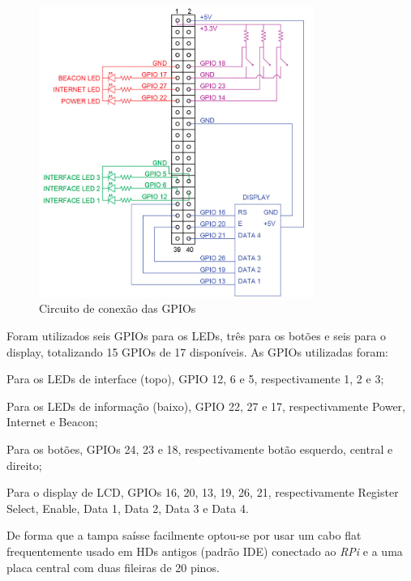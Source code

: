 \documentclass[
		12pt,				%
		openright,			%
		oneside,			%
		a4paper,			%
		chapter=TITLE,		%
		english,			%
		brazil				%
	]{abntex2}
\begin{document}
\begin{figure}[htb]
	\caption{\label{fig:pinout-gpio}Circuito de conexão das GPIOs}
	\begin{center}
		\includegraphics[width=0.8\textwidth]{img/pinout-gpio.jpg}
	\end{center}
\end{figure}

Foram utilizados seis GPIOs para os LEDs, três para os botões e seis para o display, totalizando 15 GPIOs de 17 disponíveis. As GPIOs utilizadas foram:

\begin{alineas}
	\item Para os LEDs de interface (topo), GPIO 12, 6 e 5, respectivamente 1, 2 e 3;
	\item Para os LEDs de informação (baixo), GPIO 22, 27 e 17, respectivamente Power, Internet e Beacon;
	\item Para os botões, GPIOs 24, 23 e 18, respectivamente botão esquerdo, central e direito;
	\item Para o display de LCD, GPIOs 16, 20, 13, 19, 26, 21, respectivamente Register Select, Enable, Data 1, Data 2, Data 3 e Data 4.
\end{alineas}

De forma que a tampa saísse facilmente optou-se por usar um cabo flat frequentemente usado em HDs antigos (padrão IDE) conectado ao \textit{RPi} e a uma placa central com duas fileiras de 20 pinos.
\end{document}
